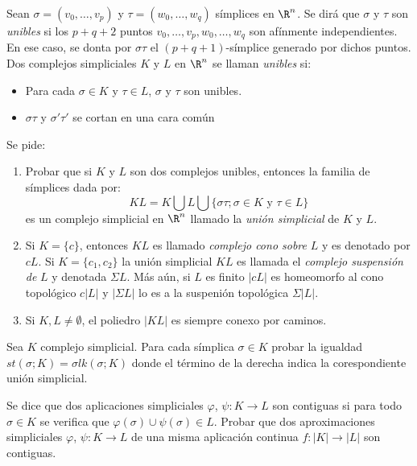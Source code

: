 \documentclass[twoside]{article}
\begin{document}
\newpage

\begin{ejercicio}{1.2}
Sean $σ = (v_0,\dots,v_p)$ y $τ = (w_0,\dots,w_q)$ símplices en $\R^n$.
Se dirá que $σ$ y $τ$ son \emph{unibles} si los $p+q+2$ puntos $v_0,\dots,v_p,w_0,\dots,w_q$ son afínmente independientes.
En ese caso, se donta por $στ$ el $(p+q+1)$-símplice generado por dichos puntos.
Dos complejos simpliciales $K$ y $L$ en $\R^n$ se llaman \emph{unibles} si:
\begin{itemize}
\item Para cada $σ \in K$ y $τ \in L$, $σ$ y $τ$ son unibles.
\item $στ$ y $σ'τ'$ se cortan en una cara común
\end{itemize}
Se pide:
\begin{enumerate}
\item Probar que si $K$ y $L$ son dos complejos unibles, entonces la familia de símplices dada por:
\[ KL = K \bigcup L \bigcup \{στ; σ \in K \text{ y }τ \in L\} \]
es un complejo simplicial en $\R^n$ llamado la \emph{unión simplicial} de $K$ y $L$.
\item Si $K = \{c\}$, entonces $KL$ es llamado \emph{complejo cono sobre} $L$ y es denotado por $cL$.
Si $K = \{c_1,c_2\}$ la unión simplicial $KL$ es llamada el \emph{complejo suspensión de} $L$ y denotada $ΣL$.
Más aún, si $L$ es finito $|cL|$ es homeomorfo al cono topológico $c|L|$ y $|ΣL|$ lo es a la suspenión topológica $Σ|L|$.
\item Si $K, L \neq \emptyset$, el poliedro $|KL|$ es siempre conexo por caminos.
\end{enumerate}
\end{ejercicio}
\begin{solucion}
\end{solucion}

\newpage

\begin{ejercicio}{1.3}
Sea $K$ complejo simplicial.
Para cada símplica $σ \in K$ probar la igualdad $st(σ;K) = σlk(σ;K)$ donde el término de la derecha indica la corespondiente unión simplicial.
\end{ejercicio}
\begin{solucion}
\end{solucion}

\newpage

\begin{ejercicio}{1.4}
Se dice que dos aplicaciones simpliciales $φ$, $ψ : K \to L$ son contiguas si para todo $σ \in K$ se verifica que $φ(σ) \cup ψ(σ) \in L$.
Probar que dos aproximaciones simpliciales $φ$, $ψ : K \to L$ de una misma aplicación continua $f : |K| \to |L|$ son contiguas.
\end{ejercicio}
\begin{solucion}
\end{solucion}
\end{document}
